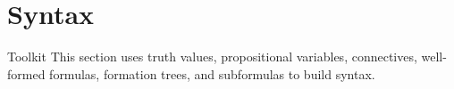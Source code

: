 \section{Syntax}

\begin{toolkitbox}{Toolkit}
This section uses truth values, propositional variables, connectives,
well-formed formulas, formation trees, and subformulas to build syntax.
\end{toolkitbox}


